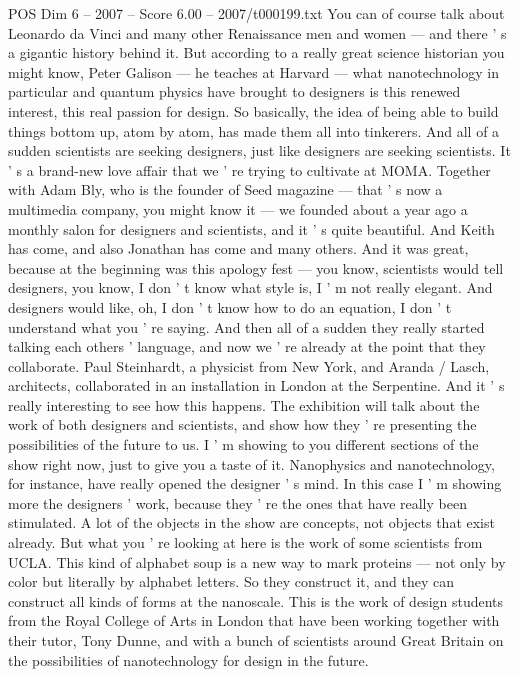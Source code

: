 \begin{textsample}{POS Dim 6 – 2007 – Score 6.00 – 2007/t000199.txt}
You can of course talk about Leonardo da Vinci and many other Renaissance men and women — and there ' s a gigantic history behind it.
But according to a really great science historian you might know, Peter Galison — he teaches at Harvard — what nanotechnology in particular and quantum physics have brought to designers is this renewed interest, this real passion for design.
So basically, the idea of being able to build things bottom up, atom by atom, has made them all into tinkerers.
And all of a sudden scientists are seeking designers, just like designers are seeking scientists.
It ' s a brand-new love affair that we ' re trying to cultivate at MOMA.
Together with Adam Bly, who is the founder of Seed magazine — that ' s now a multimedia company, you might know it — we founded about a year ago a monthly salon for designers and scientists, and it ' s quite beautiful.
And Keith has come, and also Jonathan has come and many others.
And it was great, because at the beginning was this apology fest — you know, scientists would tell designers, you know, I don ' t know what style is, I ' m not really elegant.
And designers would like, oh, I don ' t know how to do an equation, I don ' t understand what you ' re saying.
And then all of a sudden they really started talking each others ' language, and now we ' re already at the point that they collaborate.
Paul Steinhardt, a physicist from New York, and Aranda / Lasch, architects, collaborated in an installation in London at the Serpentine.
And it ' s really interesting to see how this happens.
The exhibition will talk about the work of both designers and scientists, and show how they ' re presenting the possibilities of the future to us.
I ' m showing to you different sections of the show right now, just to give you a taste of it.
Nanophysics and nanotechnology, for instance, have really opened the designer ' s mind.
In this case I ' m showing more the designers ' work, because they ' re the ones that have really been stimulated.
A lot of the objects in the show are concepts, not objects that exist already.
But what you ' re looking at here is the work of some scientists from UCLA.
This kind of alphabet soup is a new way to mark proteins — not only by color but literally by alphabet letters.
So they construct it, and they can construct all kinds of forms at the nanoscale.
This is the work of design students from the Royal College of Arts in London that have been working together with their tutor, Tony Dunne, and with a bunch of scientists around Great Britain on the possibilities of nanotechnology for design in the future.

\end{textsample}

